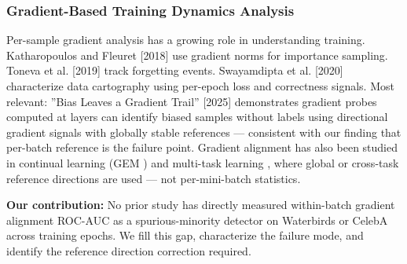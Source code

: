\subsubsection{Gradient-Based Training Dynamics Analysis}

Per-sample gradient analysis has a growing role in understanding training. Katharopoulos and Fleuret [2018] use gradient norms for importance sampling. Toneva et al. [2019] track forgetting events. Swayamdipta et al. [2020] characterize data cartography using per-epoch loss and correctness signals. Most relevant: ''Bias Leaves a Gradient Trail'' [2025] demonstrates gradient probes computed at layers can identify biased samples without labels using directional gradient signals with globally stable references --- consistent with our finding that per-batch reference is the failure point. Gradient alignment has also been studied in continual learning (GEM \citep{LopezPaz2017}) and multi-task learning \citep{Yu2020}, where global or cross-task reference directions are used --- not per-mini-batch statistics.

\textbf{Our contribution:} No prior study has directly measured within-batch gradient alignment ROC-AUC as a spurious-minority detector on Waterbirds or CelebA across training epochs. We fill this gap, characterize the failure mode, and identify the reference direction correction required.

